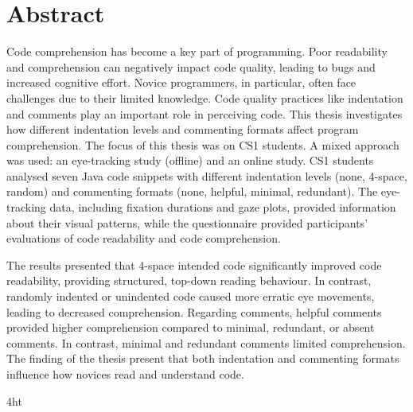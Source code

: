 \documentclass[14pt, a4paper, twoside, bibliography=totoc, headsepline, cleardoublepage=empty, parskip=half, draft=false]{scrbook}
\begin{document}
\cleardoublepage

\section*{Abstract}

Code comprehension has become a key part of programming. Poor readability and comprehension can negatively impact code quality, leading to bugs and increased cognitive effort. Novice programmers, in particular, often face challenges due to their limited knowledge. Code quality practices like indentation and comments play an important role in perceiving code. This thesis investigates how different indentation levels and commenting formats affect program comprehension. The focus of this thesis was on CS1 students.  A mixed approach was used: an eye-tracking study (offline) and an online study. CS1 students analysed seven Java code snippets with different indentation levels (none, 4-space, random) and commenting formats (none, helpful, minimal, redundant). The eye-tracking data, including fixation durations and gaze plots, provided information about their visual patterns, while the questionnaire provided participants' evaluations of code readability and code comprehension. 

The results presented that 4-space intended code significantly improved code readability, providing structured, top-down reading behaviour. In contrast, randomly indented or unindented code caused more erratic eye movements, leading to decreased comprehension. Regarding comments, helpful comments provided higher comprehension compared to minimal, redundant, or absent comments.  In contrast, minimal and redundant comments limited comprehension. The finding of the thesis present that both indentation and commenting formats influence how novices read and understand code.
\cleardoublepage



\iftex4ht
\else
\fi

%
%

%
%
%
\pagestyle{plain}
\tableofcontents
\end{document}
